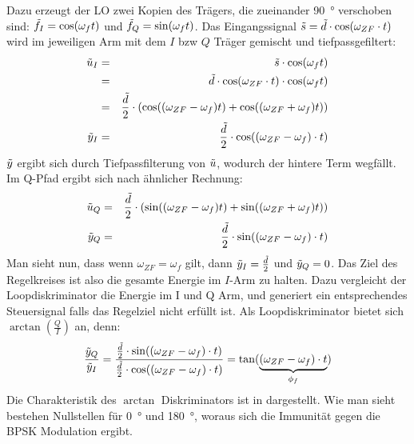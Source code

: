 Dazu erzeugt der LO zwei Kopien des Trägers, die zueinander \SI{90}{\degree} verschoben sind: $\tilde{f}_I=\cos(\omega_{f} t)$ und  $\tilde{f}_Q=\sin(\omega_{f} t)$. Das Eingangssignal $\tilde{s}=\tilde{d} \cdot \cos(\omega_{ZF} \cdot t)$ wird im jeweiligen Arm mit dem $I$ bzw $Q$ Träger gemischt und tiefpassgefiltert:
\begin{eqnarray}
	\tilde{u}_I &=& \tilde{s} \cdot \cos(\omega_{f} t)\\
		    &=& \tilde{d} \cdot \cos(\omega_{ZF} \cdot t) \cdot \cos(\omega_{f} t)\\
            &=& \frac{\tilde{d}}{2} \cdot (\cos((\omega_{ZF}-\omega_{f}) t)+ \cos((\omega_{ZF}+\omega_{f}) t)) \\
    \tilde{y}_I &=& \frac{\tilde{d}}{2} \cdot \cos((\omega_{ZF}-\omega_{f})\cdot t)
\end{eqnarray}
$\tilde{y}$  ergibt sich durch Tiefpassfilterung von $\tilde{u}$, wodurch der hintere Term wegfällt. Im Q-Pfad ergibt sich nach ähnlicher Rechnung:
\begin{eqnarray}
\tilde{u}_Q &=& \frac{\tilde{d}}{2} \cdot (\sin((\omega_{ZF}-\omega_{f}) t)+ \sin((\omega_{ZF}+\omega_{f}) t))\\
\tilde{y}_Q &=& \frac{\tilde{d}}{2} \cdot \sin((\omega_{ZF}-\omega_{f})\cdot t)
\end{eqnarray}
Man sieht nun, dass wenn $\omega_{ZF}=\omega_{f}$ gilt, dann $\tilde{y}_I = \frac{\tilde{d}}{2}$  und $\tilde{y}_Q =0$. Das Ziel des Regelkreises ist also die gesamte Energie im $I$-Arm zu halten.
Dazu vergleicht der Loopdiskriminator die Energie im I und Q Arm, und generiert ein entsprechendes Steuersignal falls das Regelziel nicht erfüllt ist. Als Loopdiskriminator bietet sich $\arctan\left(\frac{Q}{I}\right)$ an, denn:
\begin{equation}
	\frac{\tilde{y}_Q}{\tilde{y}_I} = \frac{ \frac{\tilde{d}}{2} \cdot \sin((\omega_{ZF}-\omega_{f})\cdot t)}{\frac{\tilde{d}}{2} \cdot \cos((\omega_{ZF}-\omega_{f})\cdot t)} = \tan({\underbrace{(\omega_{ZF}-\omega_{f})\cdot t}_{\phi_f}})
\end{equation}
Die Charakteristik des $\arctan$ Diskriminators ist in  dargestellt. Wie man sieht bestehen Nullstellen für \SI{0}{\degree} und \SI{180}{\degree}, woraus sich die Immunität gegen die BPSK Modulation ergibt.


